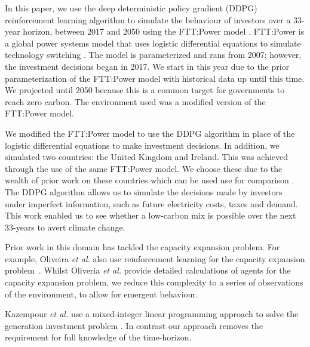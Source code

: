 \documentclass{article}
\begin{document}
In this paper, we use the deep deterministic policy gradient (DDPG) reinforcement learning algorithm to simulate the behaviour of investors over a 33-year horizon, between 2017 and 2050 using the FTT:Power model \cite{Hunt2016a}. FTT:Power is a global power systems model that uses logistic differential equations to simulate technology switching \cite{Mercure2012}. The model is parameterized and rans from 2007; however, the investment decisions began in 2017. We start in this year due to the prior parameterization of the FTT:Power model with historical data up until this time. We projected until 2050 because this is a common target for governments to reach zero carbon. The environment used was a modified version of the FTT:Power model. 

We modified the FTT:Power model to use the DDPG algorithm in place of the logistic differential equations to make investment decisions. In addition, we simulated two countries: the United Kingdom and Ireland. This was achieved through the use of the same FTT:Power model. We choose these due to the wealth of prior work on these countries which can be used use for comparison \cite{Hall2016, Hughes2010}. The DDPG algorithm allows us to simulate the decisions made by investors under imperfect information, such as future electricity costs, taxes and demand. This work enabled us to see whether a low-carbon mix is possible over the next 33-years to avert climate change. 


Prior work in this domain has tackled the capacity expansion problem. For example, Oliveira \textit{et al.} also use reinforcement learning for the capacity expansion problem~\cite{Oliveira2018}. Whilst Oliveria \textit{et al.} provide detailed calculations of agents for the capacity expansion problem, we reduce this complexity to a series of observations of the environment, to allow for emergent behaviour. 

Kazempour \textit{et al.} use a mixed-integer linear programming approach to solve the generation investment problem \cite{Kazempour2011}. In contrast our approach removes the requirement for full knowledge of the time-horizon. %
\end{document}

